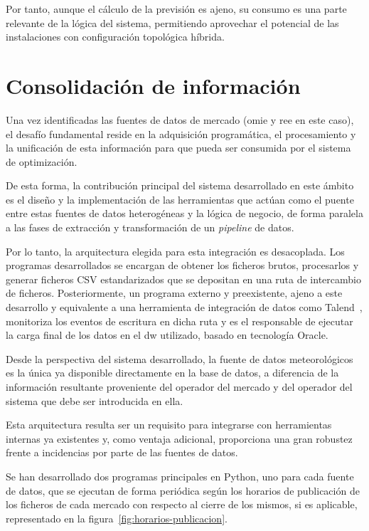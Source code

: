 Por tanto, aunque el cálculo de la previsión es ajeno, su consumo es una parte relevante de la lógica del sistema, permitiendo aprovechar el potencial de las instalaciones con configuración topológica híbrida.

\section{Consolidación de información}%
\label{makereference4.4}

Una vez identificadas las fuentes de datos de mercado (\gls{omie} y \gls{ree} en este caso), el desafío fundamental reside en la adquisición programática, el procesamiento y la unificación de esta información para que pueda ser consumida por el sistema de optimización.

De esta forma, la contribución principal del sistema desarrollado en este ámbito es el diseño y la implementación de las herramientas que actúan como el puente entre estas fuentes de datos heterogéneas y la lógica de negocio, de forma paralela a las fases de extracción y transformación de un \textit{pipeline} de datos.

Por lo tanto, la arquitectura elegida para esta integración es desacoplada. Los programas desarrollados se encargan de obtener los ficheros brutos, procesarlos y generar ficheros CSV estandarizados que se depositan en una ruta de intercambio de ficheros. Posteriormente, un programa externo y preexistente, ajeno a este desarrollo y equivalente a una herramienta de integración de datos como Talend~\cite{talend2025modern}, monitoriza los eventos de escritura en dicha ruta y es el responsable de ejecutar la carga final de los datos en el \gls{dw} utilizado, basado en tecnología Oracle.

Desde la perspectiva del sistema desarrollado, la fuente de datos meteorológicos es la única ya disponible directamente en la base de datos, a diferencia de la información resultante proveniente del operador del mercado y del operador del sistema que debe ser introducida en ella.

Esta arquitectura resulta ser un requisito para integrarse con herramientas internas ya existentes y, como ventaja adicional, proporciona una gran robustez frente a incidencias por parte de las fuentes de datos.

Se han desarrollado dos programas principales en Python, uno para cada fuente de datos, que se ejecutan de forma periódica según los horarios de publicación de los ficheros de cada mercado con respecto al cierre de los mismos, si es aplicable, representado en la figura~\ref{fig:horarios-publicacion}.

